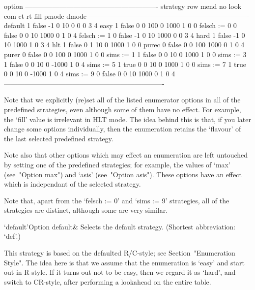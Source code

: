 \begintt
                                option
            ----------------------------------------------------------
strategy    row   mend  no  look  com    ct     rt  fill  pmode  dmode
----------------------------------------------------------------------
default       1  false  -1     0   10     0      0     0      3      4
easy          1  false   0     0  100     0   1000     1      0      0
felsch := 0   0  false   0     0   10  1000      0     1      0      4
felsch := 1   0  false  -1     0   10  1000      0     0      3      4
hard          1  false  -1     0   10  1000      1     0      3      4
hlt           1  false   0     1   10     0   1000     1      0      0
purec         0  false   0     0  100  1000      0     1      0      4
purer         0  false   0     0  100     0   1000     1      0      0
sims := 1     1  false   0     0   10     0   1000     1      0      0
sims := 3     1  false   0     0   10     0  -1000     1      0      4
sims := 5     1   true   0     0   10     0   1000     1      0      0
sims := 7     1   true   0     0   10     0  -1000     1      0      4
sims := 9     0  false   0     0   10  1000      0     1      0      4
----------------------------------------------------------------------
\endtt

Note that we explicitly (re)set all of the listed  enumerator  options
in all of the predefined strategies, even although some of  them  have
no effect. For example, the `fill' value is irrelevant  in  HLT  mode.
The idea behind this  is  that,  if  you  later  change  some  options
individually, then the enumeration retains the `flavour' of  the  last
selected predefined strategy.

Note also that other options which may effect an enumeration are  left
untouched by setting one of the predefined  strategies;  for  example,
the values of `max' (see~"Option max") and `asis' (see~"Option asis").
These options have an effect which  is  independant  of  the  selected
strategy.

Note that, apart from the `felsch := 0' and `sims  :=  9'  strategies,
all of the strategies are distinct, although some are very similar.


\beginitems

\>`default'{Option default}&
Selects the default strategy. (Shortest abbreviation: `def'.)

This   strategy   is   based   on   the   defaulted   R/C-style;   see
Section~"Enumeration Style". The idea here is that we assume that  the
enumeration is \lq{}easy' and start out in R-style. If  it  turns  out
not to be easy, then  we  regard  it  as  \lq{}hard',  and  switch  to
CR-style, after performing a lookahead on the entire table.

